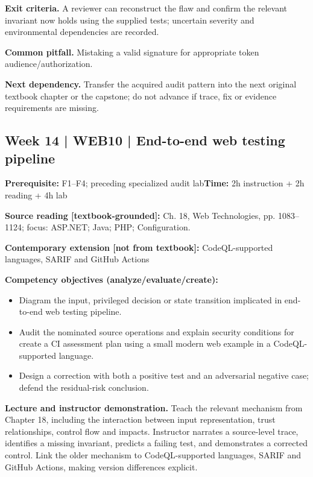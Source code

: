 \documentclass[10pt,letterpaper]{article}
\begin{document}
\textbf{Exit criteria.} A reviewer can reconstruct the flaw and confirm the relevant invariant now holds using the supplied tests; uncertain severity and environmental dependencies are recorded.

\textbf{Common pitfall.} Mistaking a valid signature for appropriate token audience/authorization.

\textbf{Next dependency.} Transfer the acquired audit pattern into the next original textbook chapter or the capstone; do not advance if trace, fix or evidence requirements are missing.

\subsection{Week 14 | WEB10 | End-to-end web testing pipeline}
\textbf{Prerequisite:} F1--F4; preceding specialized audit lab\hfill\textbf{Time:} 2h instruction + 2h reading + 4h lab

\textbf{Source reading [textbook-grounded]:} Ch. 18, Web Technologies, pp. 1083--1124; focus: ASP.NET; Java; PHP; Configuration.

\textbf{Contemporary extension [not from textbook]:} CodeQL-supported languages, SARIF and GitHub Actions

\textbf{Competency objectives (analyze/evaluate/create):}
\begin{itemize}[leftmargin=*,itemsep=2pt]
\item Diagram the input, privileged decision or state transition implicated in end-to-end web testing pipeline.
\item Audit the nominated source operations and explain security conditions for create a CI assessment plan using a small modern web example in a CodeQL-supported language.
\item Design a correction with both a positive test and an adversarial negative case; defend the residual-risk conclusion.
\end{itemize}
\textbf{Lecture and instructor demonstration.} Teach the relevant mechanism from Chapter 18, including the interaction between input representation, trust relationships, control flow and impacts. Instructor narrates a source-level trace, identifies a missing invariant, predicts a failing test, and demonstrates a corrected control. Link the older mechanism to CodeQL-supported languages, SARIF and GitHub Actions, making version differences explicit.
\end{document}
